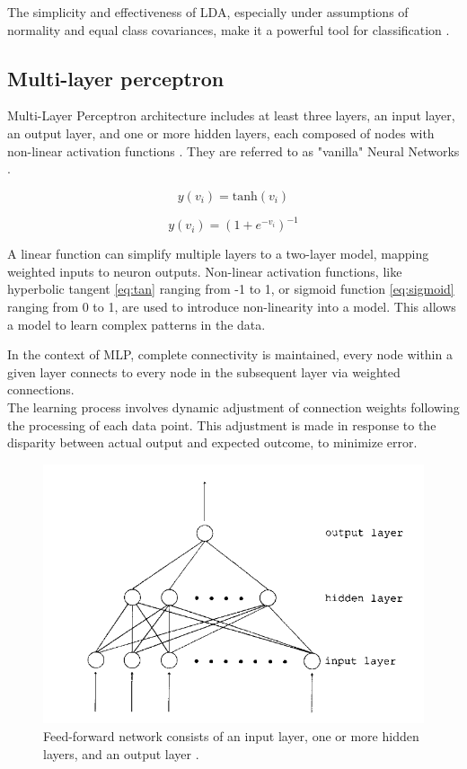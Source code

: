             The simplicity and effectiveness of LDA, especially under assumptions of normality and equal class covariances, make it a powerful tool for classification \cite{balakrishnama_linear_nodate}.

        \subsection{Multi-layer perceptron}
            Multi-Layer Perceptron architecture includes at least three layers, an input layer, an output layer, and one or more hidden layers, each composed of nodes with non-linear activation functions \cite{svozil_introduction_1997}. They are referred to as "vanilla" Neural Networks \cite{hastie_elements_2009}.

        \begin{equation}\label{eq:tan}
            y(v_i) = \text{tanh}(v_i) 
        \end{equation}

        \begin{equation}\label{eq:sigmoid}
            y(v_i) = (1+e^{-v_i})^{-1} 
        \end{equation}

            A linear function can simplify multiple layers to a two-layer model, mapping weighted inputs to neuron outputs. Non-linear activation functions, like hyperbolic tangent \ref{eq:tan} ranging from -1 to 1, or sigmoid function \ref{eq:sigmoid} ranging from 0 to 1, are used to introduce non-linearity into a model. This allows a model to learn complex patterns in the data.

        \newpage

        In the context of MLP, complete connectivity is maintained, every node within a given layer connects to every node in the subsequent layer via weighted connections. \\
        The learning process involves dynamic adjustment of connection weights following the processing of each data point. This adjustment is made in response to the disparity between actual output and expected outcome, to minimize error.

        \begin{figure}[H]
            \centering
            \includegraphics[width=.7\textwidth]{../src/resources/images/models/feedforward.png}
            \caption{
                Feed-forward network consists of an input layer, one or more hidden layers, and an output layer \cite{svozil_introduction_1997}.
            }
            \label{fig:multi_layer_perceptron}
        \end{figure}
    
